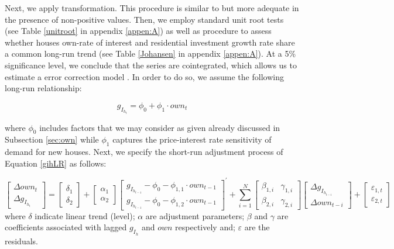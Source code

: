 \documentclass[12pt, a4paper]{article}
\begin{document}
Next, we apply \textcite{yeo_new_2000} transformation.
This procedure is similar to \textcite{box_analysis_1964} but more adequate in the presence of non-positive values.
Then, we employ standard unit root tests (see Table \ref{unitroot} in appendix \ref{appen:A}) as well as \textcite{johansen_estimation_1991} procedure to assess whether houses own-rate of interest and residential investment growth rate share a common long-run trend (see Table \ref{Johansen} in appendix \ref{appen:A}).
At a 5\% significance level, we conclude that the series are cointegrated, which allows us to estimate a error correction model \cite{enders_applied_2014}.
In order to do so, we assume the following long-run relationship:

\begin{latex}
\begin{equation}
\label{gihLR}
g_{I_{h_{t}}} = \phi_{0} + \phi_{1}\cdot own_{t}
\end{equation}
\end{latex}
where \(\phi_0\) includes factors that we may consider as given already discussed in Subsection \ref{sec:own} while \(\phi_1\) captures the price-interest rate sensitivity of demand for new houses.
Next, we specify the short-run adjustment process of Equation \ref{gihLR} as follows:

\begin{equation}
\label{matrix}
\begin{bmatrix}
\Delta own_{t}\\
\Delta g_{I_{h_{t}}}
\end{bmatrix} = \begin{bmatrix}\delta_{1}\\ \delta_{2}\end{bmatrix} + \begin{bmatrix}\alpha_{1}\\ \alpha_{2}\end{bmatrix} \begin{bmatrix}g_{I_{h_{t-1}}} - \phi_{0} - \phi_{1,1}\cdot own_{t-1}\\g_{I_{h_{t-1}}} - \phi_{0} - \phi_{1,2}\cdot own_{t-1}\end{bmatrix}^{\prime} + \sum^N_{i=1} \begin{bmatrix}\beta_{1,i} & \gamma_{1,i} \\\beta_{2,i} & \gamma_{2,i} \end{bmatrix} \begin{bmatrix}\Delta g_{I_{h_{t-i}}} \\\Delta own_{t-i}\end{bmatrix} + \begin{bmatrix}\varepsilon_{1,t}\\\varepsilon_{2,t}\end{bmatrix}
\end{equation}
where \(\delta\) indicate linear trend (level);
\(\alpha\) are adjustment parameters;
\(\beta\) and \(\gamma\) are coefficients associated with lagged \(g_{I_h}\) and \(own\) respectively and; \(\varepsilon\) are the residuals.
\end{document}
